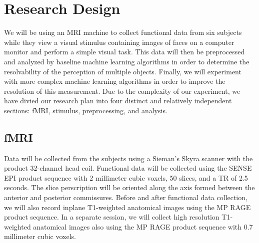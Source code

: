 \documentclass[12pt]{article}
\begin{document}
\section{Research Design}
We will be using an MRI machine to collect functional data from six subjects while they view a visual stimulus containing images of faces on a computer monitor and perform a simple visual task.
This data will then be preprocessed and analyzed by baseline machine learning algorithms in order to determine the resolvability of the perception of multiple objects.
Finally, we will experiment with more complex machine learning algorithms in order to improve the resolution of this measurement.
Due to the complexity of our experiment, we have divied our research plan into four distinct and relatively independent sections: fMRI, stimulus, preprocessing, and analysis.

\subsection{fMRI}
Data will be collected from the subjects using a Sieman's Skyra scanner with the product 32-channel head coil.
Functional data will be collected using the SENSE EPI product sequence with 2 millimeter cubic voxels, 50 slices, and a TR of 2.5 seconds.
The slice perscription will be oriented along the axis formed between the anterior and posterior commissures.
Before and after functional data collection, we will also record inplane T1-weighted anatomical images using the MP RAGE product sequence.
In a separate session, we will collect high resolution T1-weighted anatomical images also using the MP RAGE product sequence with 0.7 millimeter cubic voxels.
\end{document}
